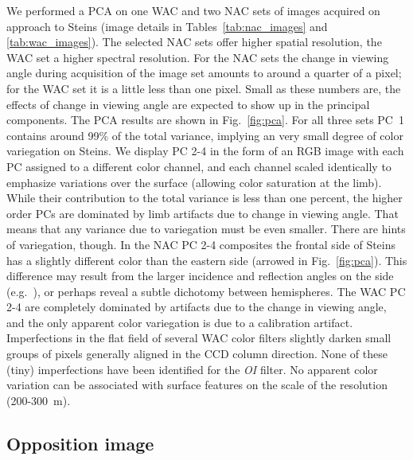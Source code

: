 \documentclass[preprint,3p,authoryear]{elsarticle}
\begin{document}
We performed a PCA on one WAC and two NAC sets of images acquired on approach to Steins (image details in Tables~\ref{tab:nac_images} and \ref{tab:wac_images}). The selected NAC sets offer higher spatial resolution, the WAC set a higher spectral resolution. For the NAC sets the change in viewing angle during acquisition of the image set amounts to around a quarter of a pixel; for the WAC set it is a little less than one pixel. Small as these numbers are, the effects of change in viewing angle are expected to show up in the principal components. The PCA results are shown in Fig.~\ref{fig:pca}. For all three sets PC~1 contains around 99\% of the total variance, implying an very small degree of color variegation on Steins. We display PC 2-4 in the form of an RGB image with each PC assigned to a different color channel, and each channel scaled identically to emphasize variations over the surface (allowing color saturation at the limb). While their contribution to the total variance is less than one percent, the higher order PCs are dominated by limb artifacts due to change in viewing angle. That means that any variance due to variegation must be even smaller. There are hints of variegation, though. In the NAC PC 2-4 composites the frontal side of Steins has a slightly different color than the eastern side (arrowed in Fig.~\ref{fig:pca}). This difference may result from the larger incidence and reflection angles on the side (e.g.\ \citealt{V97}), or perhaps reveal a subtle dichotomy between hemispheres. The WAC PC 2-4 are completely dominated by artifacts due to the change in viewing angle, and the only apparent color variegation is due to a calibration artifact. Imperfections in the flat field of several WAC color filters slightly darken small groups of pixels generally aligned in the CCD column direction. None of these (tiny) imperfections have been identified for the {\it OI} filter. No apparent color variation can be associated with surface features on the scale of the resolution (200-300~m).

\subsection{Opposition image}
\end{document}
